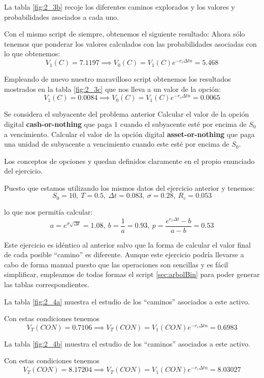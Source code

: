 \begin{problem}[3]
La tabla \ref{fig:2_3b} recoje los diferentes caminos explorados y los valores y probabilidades asociados a cada uno.

Con el mismo script de siempre, obtenemos el siguiente resultado:
Ahora sólo tenemos que ponderar los valores calculados con las probabilidades asociadas con lo que obtenemos:
\[V_1(C) = 7.1197 \implies V_0(C) = V_1(C)e^{-r_cΔtn} = 5.468\]

\spart

Empleando de nuevo nuestro maravilloso script obtenemos los resultados mostrados en la tabla \ref{fig:2_3c} que nos lleva a un valor de la opción:
\[V_1(C) = 0.0084 \implies V_0(C) = V_1(C)e^{-r_cΔtn} = 0.0065\]
\end{problem}


\begin{problem}[4]
Se considera el subyacente del problema anterior
\ppart Calcular el valor de la opción digital \textbf{cash-or-nothing} que paga $1$ cuando el subyacente esté por encima de $S_0$ a vencimiento.
\ppart Calcular el valor de la opción digital \textbf{asset-or-nothing} que paga una unidad de subyacente a vencimiento cuando este esté por encima de $S_0$.
\solution


Los conceptos de opciones  y  quedan definidos claramente en el propio enunciado del ejercicio.

Puesto que estamos utilizando los mismos datos del ejercicio anterior y tenemos:
\[S_0=10, \ T=0.5, \ Δt = 0.083, \ σ=0.28, \ R_c=0.053\]

lo que nos permitía calcular:
\[a=e^{σ\sqrt{Δt}} = 1.08, \ b = \frac{1}{a} = 0.93, \ p = \frac{e^{r_cΔt}-b}{a-b}=0.53\]

Este ejercicio es idéntico al anterior salvo que la forma de calcular el valor final de cada posible ``camino'' es diferente. Aunque este ejercicio podría llevarse a cabo de forma manual puesto que las operaciones son sencillas y es fácil simplificar, empleamos de todas formas el script \ref{sec:arbolBin} para poder generar las tablas correspondientes.

\spart

La tabla \ref{fig:2_4a} muestra el estudio de los ``caminos'' asociados a este activo.


Con estas condiciones tenemos
\[V_T(CON) = 0.7106 \implies V_T(CON) = V_1(CON)e^{-r_cΔtn} = 0.6983\]

\spart

La tabla \ref{fig:2_4b} muestra el estudio de los ``caminos'' asociados a este activo.

Con estas condiciones tenemos
\[V_T(CON) = 8.17204 \implies V_T(CON) = V_1(CON)e^{-r_cΔtn} = 8.03027\]

\end{problem}

